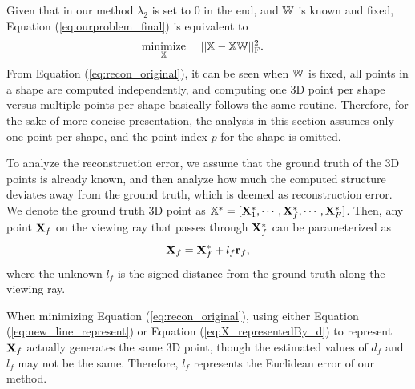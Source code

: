 Given that in our method $\lambda_2$ is set to 0 in the end, and $\mathbb W$ is known and fixed, Equation (\ref{eq:ourproblem_final}) is equivalent to
\begin{equation}
\begin{aligned}
& \underset{\mathbb X}{\text{minimize}}&& ~ || \mathbb X - \mathbb X\mathbb W||_\text{F}^2 . 
\end{aligned}
\label{eq:recon_original}
\end{equation}
From Equation (\ref{eq:recon_original}), it can be seen when $\mathbb W$ is fixed, all points in a shape are computed independently, and computing one 3D point per shape versus multiple points per shape basically follows the same routine. 
Therefore, for the sake of more concise presentation, the analysis in this section assumes only one point per shape, and the point index $p$ for the shape is omitted.

To analyze the reconstruction error, we assume that the ground truth of the 3D points is already known, and then analyze how much the computed structure deviates away from the ground truth, which is deemed as reconstruction error.
We denote the ground truth 3D point as
$\mathbb X^*=[\mathbf X_1^*, \cdots, \mathbf X_f^*,  \cdots, \mathbf X_F^*]$. 
Then, any point $\mathbf X_f$ on the viewing ray that passes through $\mathbf X^*_f$ can be parameterized as 
\begin{equation}
\mathbf X_f = \mathbf X^*_f + l_f \mathbf{r}_f,
\label{eq:new_line_represent}
\end{equation}
where the unknown $l_f$ is the signed distance from the ground truth along the viewing ray. 

When minimizing Equation (\ref{eq:recon_original}), using either Equation (\ref{eq:new_line_represent}) or Equation (\ref{eq:X_representedBy_d}) to represent $\mathbf X_f$ actually 
generates the same 3D point, though the estimated values of $d_f$ and $l_f$ may not be the same. 
Therefore, $l_f$ represents the Euclidean error of our  method. 

